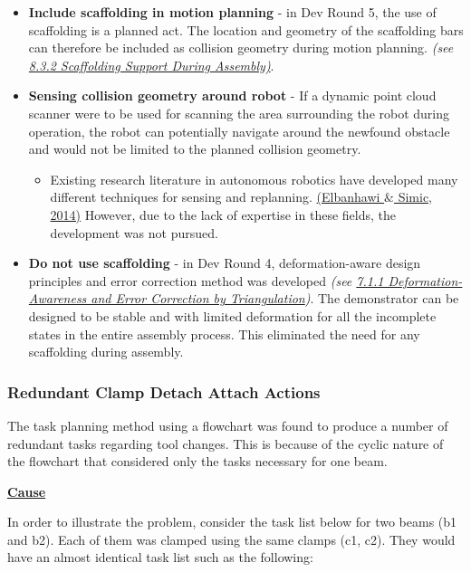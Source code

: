 \documentclass[11pt]{book}
\begin{document}
\begin{itemize}
	\item \textbf{Include scaffolding in motion planning }- in Dev Round 5, the use of scaffolding is a planned act. The location and geometry of the scaffolding bars can therefore be included as collision geometry during motion planning. \textit{\textcolor[HTML]{B7B7B7}{(see \uline{8.3.2 Scaffolding Support During Assembly)}}}.

	\item \textbf{Sensing collision geometry around robot }- If a dynamic point cloud scanner were to be used for scanning the area surrounding the robot during operation, the robot can potentially navigate around the newfound obstacle and would not be limited to the planned collision geometry. 

\begin{itemize}
	\item Existing research literature in autonomous robotics have developed many different techniques for sensing and replanning. \href{https://www.zotero.org/google-docs/?7DB2Nw}{(Elbanhawi $\&$ Simic, 2014)} However, due to the lack of expertise in these fields, the development was not pursued.

\end{itemize}
	\item \textbf{Do not use scaffolding }- in Dev Round 4, deformation-aware design principles and error correction method was developed \textit{\textcolor[HTML]{B7B7B7}{(see \uline{7.1.1 Deformation-Awareness and Error Correction by Triangulation})}}. The demonstrator can be designed to be stable and with limited deformation for all the incomplete states in the entire assembly process. This eliminated the need for any scaffolding during assembly. 

\end{itemize}
\subsubsection{Redundant Clamp Detach Attach Actions}

The task planning method using a flowchart was found to produce a number of redundant tasks regarding tool changes. This is because of the cyclic nature of the flowchart that considered only the tasks necessary for one beam. 

\textbf{\uline{Cause}}

In order to illustrate the problem, consider the task list below for two beams (b1 and b2). Each of them was clamped using the same clamps (c1, c2). They would have an almost identical task list such as the following:
\end{document}
